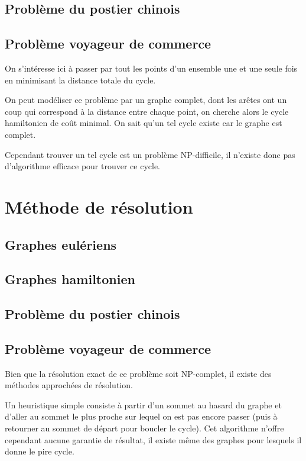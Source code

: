 \documentclass{scrartcl}
\begin{document}
  \subsection{Problème du postier chinois}
  \subsection{Problème voyageur de commerce}
    On s'intéresse ici à passer par tout les points d'un ensemble une et une
    seule fois en minimisant la distance totale du cycle.

    On peut modéliser ce problème par un graphe complet, dont les arêtes ont un
    coup qui correspond à la distance entre chaque point, on cherche alors le
    cycle hamiltonien de coût minimal. On sait qu'un tel cycle existe car le
    graphe est complet.

    Cependant trouver un tel cycle est un problème NP-difficile, il n'existe
    donc pas d'algorithme efficace pour trouver ce cycle.

\section{Méthode de résolution}
  \subsection{Graphes eulériens}
  \subsection{Graphes hamiltonien}
  \subsection{Problème du postier chinois}
  \subsection{Problème voyageur de commerce}
    Bien que la résolution exact de ce problème soit NP-complet, il existe des
    méthodes approchées de résolution.

    Un heuristique simple consiste à partir d'un sommet au hasard du graphe et
    d'aller au sommet le plus proche sur lequel on est pas encore passer (puis
    à retourner au sommet de départ pour boucler le cycle). Cet algorithme
    n'offre cependant aucune garantie de résultat, il existe même des graphes
    pour lesquels il donne le pire cycle.
\end{document}
